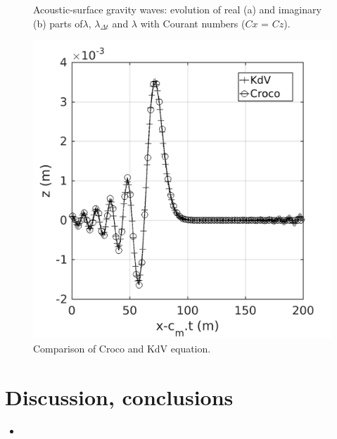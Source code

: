 \documentclass[a4paper,11pt]{article}
\begin{document}
\begin{figure}[!ht]
   \centering
   \quad
   \caption{Acoustic-surface gravity waves: evolution of real (a) and imaginary (b) parts of$\lambda$, $\lambda_{\Delta t}$ and $\lambda$ with 
            Courant numbers ($Cx$ = $Cz$).}
   \label{FigLambdagravs}
\end{figure}

\begin{figure}[!ht]
   \centering
   \includegraphics[width=.4\textwidth]{FIGURES/kdv_plot.png}
   \caption{Comparison of Croco and KdV equation.}
   \label{KdV}
\end{figure}

\newpage

 
\newpage
\section{Discussion, conclusions}
 \begin{itemize}[font=\small] 
  \item 
 \end{itemize}
 
\newpage


%
\end{document}
